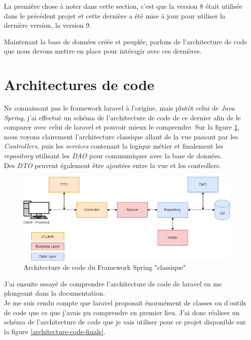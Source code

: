 \documentclass[
    iai, %
    il, %
]{heig-tb}
\begin{document}
La première chose à noter dans cette section, c'est que la version 8 était utilisée dans le précédent projet et cette dernière a été mise à jour pour utiliser la dernière version, la version 9.

Maintenant la base de données créée et peuplée, parlons de l'architecture de code que nous devons mettre en place pour intéragir avec ces dernières.

\section{Architectures de code}

Ne connaissant pas le \Gls{framework} \Gls{laravel} à l'origine, mais plutôt celui de \emph{Java Spring}, j'ai effectué un schéma de l'architecture de code de ce dernier afin de le comparer avec celui de \Gls{laravel} et pouvoir mieux le comprendre. Sur la figure \ref{architecture-code-spring}, nous voyons clairement l'architecture classique allant de la vue passant par les \emph{Controllers}, puis les \emph{services} contenant la logique métier et finalement les \emph{repository} utilisant les \emph{DAO} pour commumiquer avec la base de données. \\
Des \emph{DTO} peuvent également être ajoutées entre la vue et les controllers.

\begin{center}
    \begin{figure}[H]
        \includegraphics[width=\textwidth]{./assets/figures/architecture-code-spring.drawio.png}
        \caption{Architecture de code du Framework Spring "classique" \label{architecture-code-spring}}
    \end{figure}
\end{center}

J'ai ensuite essayé de comprendre l'architecture de code de \Gls{laravel} en me plongeant dans la documentation. \\
Je me suis rendu compte que \Gls{laravel} proposait énormément de classes ou d'outils de code que ce que j'avais pu comprendre en premier lieu. J'ai donc réaliser un schéma de l'architecture de code que je vais utiliser pour ce projet disponible sur la figure \ref{architecture-code-finale}.
\end{document}
